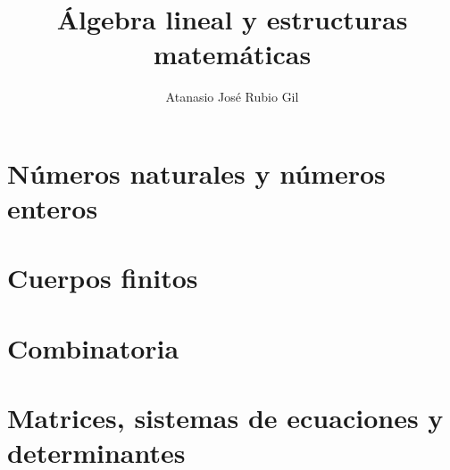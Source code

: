 \documentclass[10pt, a4paper]{aqademic}
\author{Atanasio José Rubio Gil}
\title{Álgebra lineal y estructuras matemáticas}
\begin{document}
\AqMaketitle[%
	cover    = logo-ugr.png,
	org      = Grado en Ingeniería Informática,
	subtitle = Teoría,
	url      = https://github.com/Groctel/ugr-informatica
]


\tableofcontents

\chapter{Números naturales y números enteros}\label{numeros-naturales-y-numeros-enteros}
	 \pagebreak
	
	
	
	
	
	

\chapter{Cuerpos finitos}\label{cuerpos-finitos}
	
	

\chapter{Combinatoria}\label{combinatoria}
	
	
	

\chapter{Matrices, sistemas de ecuaciones y determinantes}\label{matrices-sistemas-de-ecuaciones-y-determinantes}
	
	
\end{document}

